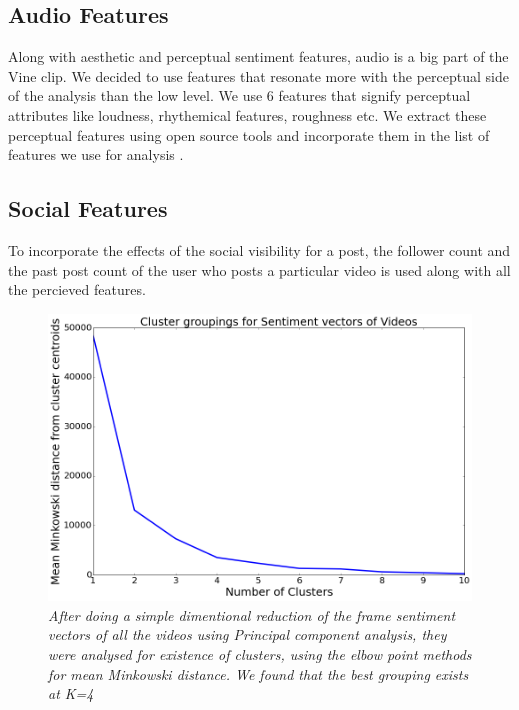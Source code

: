 \subsection{Audio Features}
Along with aesthetic and perceptual sentiment features, audio is a big part of the Vine clip. We decided to use features that resonate more with the perceptual side of the analysis than the low level. We use 6 features that signify \cite{redi20146} perceptual attributes like loudness, rhythemical features, roughness etc. We extract these perceptual features using open source tools and incorporate them in the list of features we use for analysis \cite{lartillot2007matlab} \cite{laurier2009exploring}. 

\subsection{Social Features}
To incorporate the effects of the social visibility for a post, the follower count and the past post count of the user who posts a particular video is used along with all the percieved features. 

\begin{figure}[!htb]
\centering
\includegraphics[width=\columnwidth]{plots/grouping_graph_clusters}
\caption{\textsl{ After doing a simple dimentional reduction of the frame sentiment vectors of all the videos using Principal component analysis, they were analysed for existence of clusters, using the elbow point methods for mean Minkowski distance. We found that the best grouping exists at K=4 }}
\label{fig:Elbow_method}
\end{figure}



